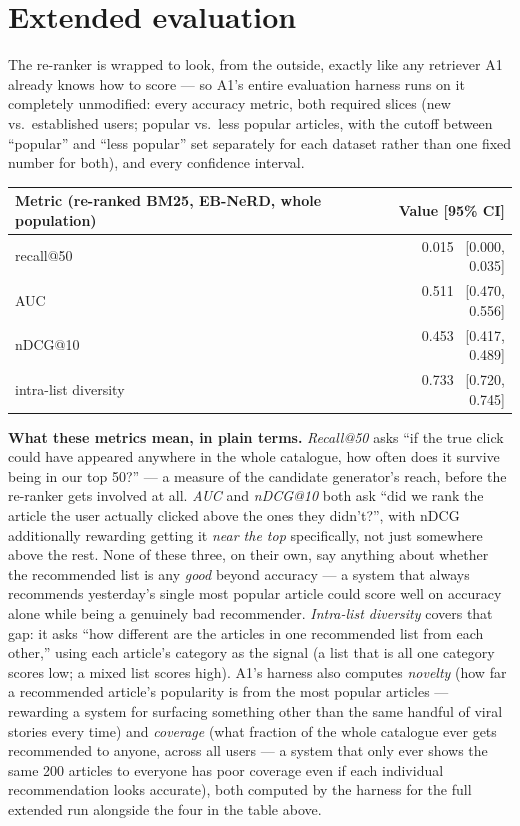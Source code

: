 \documentclass[11pt,a4paper]{article}
\begin{document}
\section{Extended evaluation}
\label{sec:q5}

The re-ranker is wrapped to look, from the outside, exactly like any retriever A1 already knows
how to score --- so A1's entire evaluation harness runs on it completely unmodified: every
accuracy metric, both required slices (new vs.\ established users; popular vs.\ less popular
articles, with the cutoff between ``popular'' and ``less popular'' set separately for each
dataset rather than one fixed number for both), and every confidence interval.

\begin{center}
\begin{tabular}{@{}lr@{}}
\toprule
\textbf{Metric (re-ranked BM25, EB-NeRD, whole population)} & \textbf{Value [95\% CI]} \\
\midrule
recall@50 & 0.015 \ [0.000, 0.035] \\
AUC & 0.511 \ [0.470, 0.556] \\
nDCG@10 & 0.453 \ [0.417, 0.489] \\
intra-list diversity & 0.733 \ [0.720, 0.745] \\
\bottomrule
\end{tabular}
\end{center}

\textbf{What these metrics mean, in plain terms.} \emph{Recall@50} asks ``if the true click could
have appeared anywhere in the whole catalogue, how often does it survive being in our top 50?'' ---
a measure of the candidate generator's reach, before the re-ranker gets involved at all.
\emph{AUC} and \emph{nDCG@10} both ask ``did we rank the article the user actually clicked above
the ones they didn't?'', with nDCG additionally rewarding getting it \emph{near the top}
specifically, not just somewhere above the rest. None of these three, on their own, say anything
about whether the recommended list is any \emph{good} beyond accuracy --- a system that always
recommends yesterday's single most popular article could score well on accuracy alone while being
a genuinely bad recommender. \emph{Intra-list diversity} covers that gap: it asks ``how different
are the articles in one recommended list from each other,'' using each article's category as the
signal (a list that is all one category scores low; a mixed list scores high). A1's harness also
computes \emph{novelty} (how far a recommended article's popularity is from the most popular
articles --- rewarding a system for surfacing something other than the same handful of viral
stories every time) and \emph{coverage} (what fraction of the whole catalogue ever gets
recommended to anyone, across all users --- a system that only ever shows the same 200 articles to
everyone has poor coverage even if each individual recommendation looks accurate), both computed
by the harness for the full extended run alongside the four in the table above.
\end{document}
